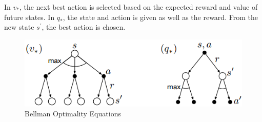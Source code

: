 \documentclass{article}
\begin{document}
\newpage
\noindent
In $v_{*}$, the next best action is selected based on the expected reward and
value of future states. In $q_{*}$, the state and action is given as well as the
reward. From the new state $s^{\prime}$, the best action is chosen.

\begin{figure}[h]
\includegraphics[scale=0.5]{bellman_optimality}
\centering
\caption{Bellman Optimality Equations}
\end{figure}
    
\end{document}

